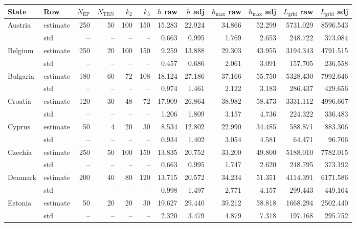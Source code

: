 \begin{table}[htbp]
\centering
\scriptsize
\setlength{\tabcolsep}{4pt}
\renewcommand{\arraystretch}{1.15}
\begin{tabular}{llrrrrrrrrrr}
\hline
State & Row & $N_{\mathrm{EP}}$ & $N_{\mathrm{TRN}}$ & $k_2$ & $k_3$ & $\overline{h}$ raw & $\overline{h}$ adj & $h_{\max}$ raw & $h_{\max}$ adj & $L_{\mathrm{grid}}$ raw & $L_{\mathrm{grid}}$ adj \\
\hline
Austria & estimate & 250 & 50 & 100 & 150 & 15.283 & 22.924 & 34.866 & 52.299 & 5731.029 & 8596.543 \\
 & std & -- & -- & -- & -- & 0.663 & 0.995 & 1.769 & 2.653 & 248.722 & 373.084 \\
\hline
Belgium & estimate & 250 & 20 & 100 & 150 & 9.259 & 13.888 & 29.303 & 43.955 & 3194.343 & 4791.515 \\
 & std & -- & -- & -- & -- & 0.457 & 0.686 & 2.061 & 3.091 & 157.705 & 236.558 \\
\hline
Bulgaria & estimate & 180 & 60 & 72 & 108 & 18.124 & 27.186 & 37.166 & 55.750 & 5328.430 & 7992.646 \\
 & std & -- & -- & -- & -- & 0.974 & 1.461 & 2.122 & 3.183 & 286.437 & 429.656 \\
\hline
Croatia & estimate & 120 & 30 & 48 & 72 & 17.909 & 26.864 & 38.982 & 58.473 & 3331.112 & 4996.667 \\
 & std & -- & -- & -- & -- & 1.206 & 1.809 & 3.157 & 4.736 & 224.322 & 336.483 \\
\hline
Cyprus & estimate & 50 & 4 & 20 & 30 & 8.534 & 12.802 & 22.990 & 34.485 & 588.871 & 883.306 \\
 & std & -- & -- & -- & -- & 0.934 & 1.402 & 3.054 & 4.581 & 64.471 & 96.706 \\
\hline
Czechia & estimate & 250 & 50 & 100 & 150 & 13.835 & 20.752 & 33.200 & 49.800 & 5188.010 & 7782.015 \\
 & std & -- & -- & -- & -- & 0.663 & 0.995 & 1.747 & 2.620 & 248.795 & 373.192 \\
\hline
Denmark & estimate & 200 & 40 & 80 & 120 & 13.715 & 20.572 & 34.234 & 51.351 & 4114.391 & 6171.586 \\
 & std & -- & -- & -- & -- & 0.998 & 1.497 & 2.771 & 4.157 & 299.443 & 449.164 \\
\hline
Estonia & estimate & 50 & 20 & 20 & 30 & 19.627 & 29.440 & 39.212 & 58.818 & 1668.294 & 2502.440 \\
 & std & -- & -- & -- & -- & 2.320 & 3.479 & 4.879 & 7.318 & 197.168 & 295.752 \\

\end{tabular}
\end{table}
